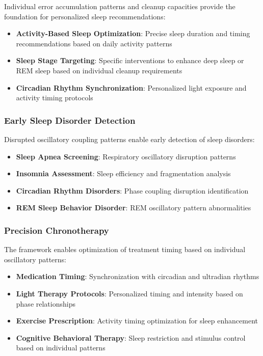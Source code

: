 \documentclass[twocolumn]{article}
\begin{document}
Individual error accumulation patterns and cleanup capacities provide the foundation for personalized sleep recommendations:

\begin{itemize}
\item \textbf{Activity-Based Sleep Optimization}: Precise sleep duration and timing recommendations based on daily activity patterns
\item \textbf{Sleep Stage Targeting}: Specific interventions to enhance deep sleep or REM sleep based on individual cleanup requirements
\item \textbf{Circadian Rhythm Synchronization}: Personalized light exposure and activity timing protocols
\end{itemize}

\subsubsection{Early Sleep Disorder Detection}

Disrupted oscillatory coupling patterns enable early detection of sleep disorders:

\begin{itemize}
\item \textbf{Sleep Apnea Screening}: Respiratory oscillatory disruption patterns
\item \textbf{Insomnia Assessment}: Sleep efficiency and fragmentation analysis
\item \textbf{Circadian Rhythm Disorders}: Phase coupling disruption identification
\item \textbf{REM Sleep Behavior Disorder}: REM oscillatory pattern abnormalities
\end{itemize}

\subsubsection{Precision Chronotherapy}

The framework enables optimization of treatment timing based on individual oscillatory patterns:

\begin{itemize}
\item \textbf{Medication Timing}: Synchronization with circadian and ultradian rhythms
\item \textbf{Light Therapy Protocols}: Personalized timing and intensity based on phase relationships
\item \textbf{Exercise Prescription}: Activity timing optimization for sleep enhancement
\item \textbf{Cognitive Behavioral Therapy}: Sleep restriction and stimulus control based on individual patterns
\end{itemize}
\end{document}
